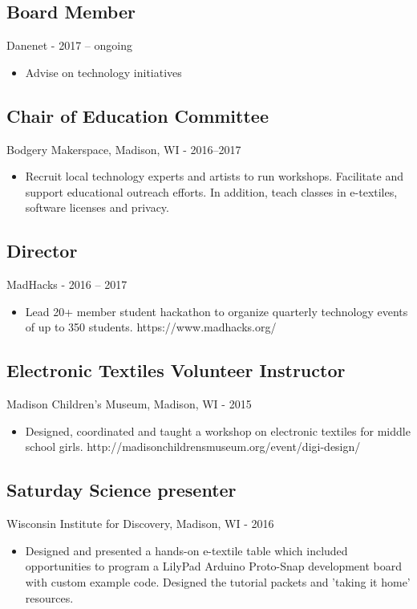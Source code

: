 \documentclass[../main.tex]{subfiles}
\begin{document}

\subsection*{Board Member}
     Danenet - 2017 -- ongoing
\begin{itemize}
		\item{Advise on technology initiatives}
\end{itemize}



\subsection*{Chair of Education Committee}
     Bodgery Makerspace, Madison, WI - 2016--2017
\begin{itemize}
		\item{Recruit local technology experts and artists to run workshops. Facilitate and support educational outreach efforts. In addition, teach classes in e-textiles, software licenses and privacy.}
	\end{itemize}

\subsection*{Director}
     MadHacks - 2016 -- 2017
\begin{itemize}
		\item{Lead 20+ member student hackathon to organize quarterly technology events of up to 350 students. https://www.madhacks.org/}
	\end{itemize}

\subsection*{Electronic Textiles Volunteer Instructor}
     Madison Children's Museum, Madison, WI - 2015
\begin{itemize}
		\item{Designed, coordinated and taught a workshop on electronic textiles for middle school girls. http://madisonchildrensmuseum.org/event/digi-design/}
	\end{itemize}

\subsection*{Saturday Science presenter}
     Wisconsin Institute for Discovery, Madison, WI - 2016
\begin{itemize}
		\item{Designed and presented a hands-on e-textile table which included opportunities to program a LilyPad Arduino Proto-Snap development board with custom example code. Designed the tutorial packets and 'taking it home' resources.}
	\end{itemize}
\end{document}
